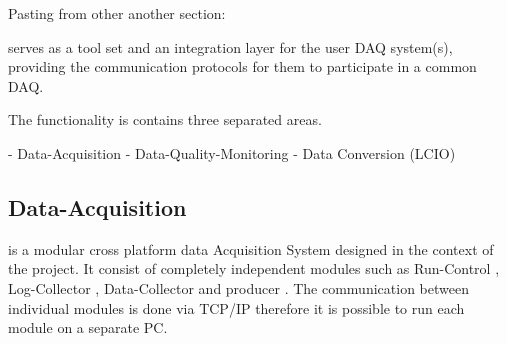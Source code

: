 
\newcommand{\subeventtype}{Sub-Event-Type }
\newcommand{\tcp}{TCP/IP }
\newcommand{\dataconverterplugin}{Data-Converter-Plugin }
\newcommand{\eventid}{Event-ID }
\newcommand{\cpp}{C++ }
\newcommand{\producer}{producer }
\newcommand{\eventtype}{Event-Type }
\newcommand{\event}{Event }
\newcommand{\eventheader}{Event-Header }
\newcommand{\timestamp}{Time-Stamp }
\newcommand{\rawdata}{Raw-Data }
\newcommand{\datablock}{Data-Block }
\newcommand{\da}{Data-Acquisition }
\newcommand{\dc}{Data-Collector }
\newcommand{\onlinemon}{Online-Monitor }
\newcommand{\hitmaps}{Hit-Maps }
\newcommand{\corplots}{Correlation-Plots }
\newcommand{\offlineana}{Offline-Analysis }
\newcommand{\filewriter}{File-Writer }
\newcommand{\rc}{Run-Control }
\newcommand{\testrc}{TestRunControl }
\newcommand{\logcollector}{Log-Collector }


Pasting  from other another section:

\eudaq serves as a tool set and an integration layer for the user DAQ system(s), providing the communication protocols for them to participate in a common DAQ. 


The functionality is contains three separated areas. 

- Data-Acquisition
- Data-Quality-Monitoring 
- Data Conversion (LCIO)

\subsection{Data-Acquisition}


\eudaq is a modular cross platform data Acquisition System designed in the context of the \eudet project. 
It consist of completely independent modules such as \rc, \logcollector, \dc and \producer. 
The communication between individual modules is done via \tcp therefore it is possible to run each module on a separate PC. 


